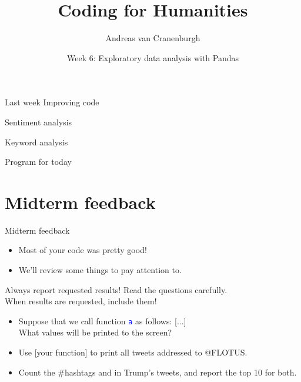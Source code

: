 \documentclass[aspectratio=169,usenames,dvipsnames]{beamer}
\title{Coding for Humanities}
\author{Andreas van Cranenburgh}
\date{Week 6: Exploratory data analysis with Pandas}
\begin{document}
\maketitle


\begin{frame}{Last week}
    Improving code

    \vspace{1em}
    Sentiment analysis

    \vspace{1em}
    Keyword analysis
\end{frame}

\begin{frame}{Program for today}
\tableofcontents
\end{frame}


\section{Midterm feedback}

\begin{frame}{Midterm feedback}
    \begin{itemize}
        \item Most of your code was pretty good!
        \item We'll review some things to pay attention to.
    \end{itemize}
\end{frame}

\begin{frame}{Always report requested results!}
    Read the questions carefully. \\
    When results are requested, include them!

    \vspace{1em}
    \begin{itemize}
        \item Suppose that we call function \textcolor{blue}{\texttt{a}}
            as follows: [...]\\
            What values will be printed to the screen?
        \item Use [your function] to print all tweets addressed to @FLOTUS.
        \item Count the \#hashtags and \@usernames in Trump's tweets, and
            report the top 10 for both.
    \end{itemize}
\end{frame}
\end{document}
